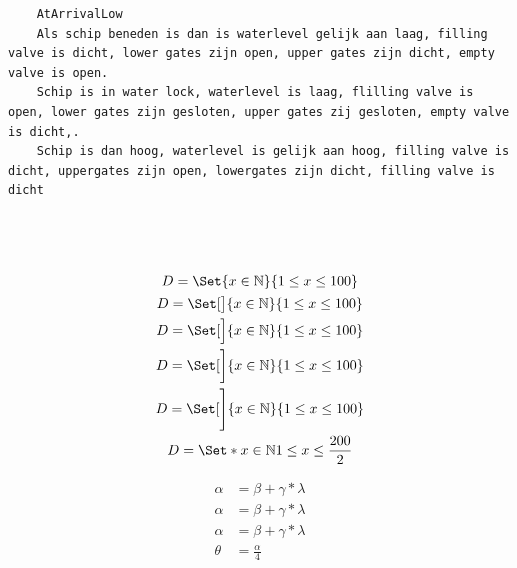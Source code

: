 \begin{verbatim}
	AtArrivalLow
	Als schip beneden is dan is waterlevel gelijk aan laag, filling valve is dicht, lower gates zijn open, upper gates zijn dicht, empty valve is open. 
	Schip is in water lock, waterlevel is laag, flilling valve is open, lower gates zijn gesloten, upper gates zij gesloten, empty valve is dicht,. 
	Schip is dan hoog, waterlevel is gelijk aan hoog, filling valve is dicht, uppergates zijn open, lowergates zijn dicht, filling valve is dicht
	
	
	
\end{verbatim}
\begin{gather*}
	D=\Set{x\in\nat}{1\le x\le 100}\\
	D=\Set[\big]{x\in\nat}{1\le x\le 100}\\
	D=\Set[\Big]{x\in\nat}{1\le x\le 100}\\
	D=\Set[\bigg]{x\in\nat}{1\le x\le 100}\\
	D=\Set[\Bigg]{x\in\nat}{1\le x\le 100}\\
	D=\Set*{x\in\nat}{1\le x\le \frac{200}{2}}
\end{gather*}

\begin{align}
	\alpha &= \beta + \gamma * \lambda \\
	\alpha &= \beta + \gamma * \lambda \\
	\alpha &= \beta + \gamma * \lambda \\
	\theta &= \frac{\alpha}{4}
\end{align} 

%
%
%




